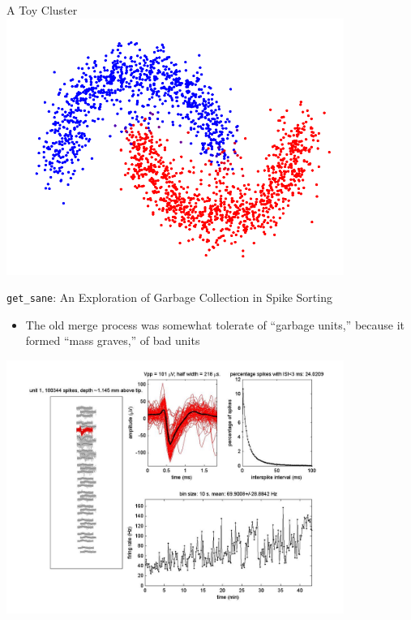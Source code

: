 \documentclass{beamer}
\begin{document}
    \begin{frame}{A Toy Cluster}
        \pause
        \includegraphics[width=110mm]{images/cluster.png}
    \end{frame}

    \begin{frame}{\texttt{get\_sane}: An Exploration of Garbage Collection in
Spike Sorting}
        \begin{itemize}
            \pause
            \item The old merge process was somewhat tolerate of ``garbage
units,'' because it formed ``mass graves,'' of bad units
            \pause
        \end{itemize}
        \includegraphics[width=110mm]{images/unit1.jpg}
    \end{frame}
\end{document}
